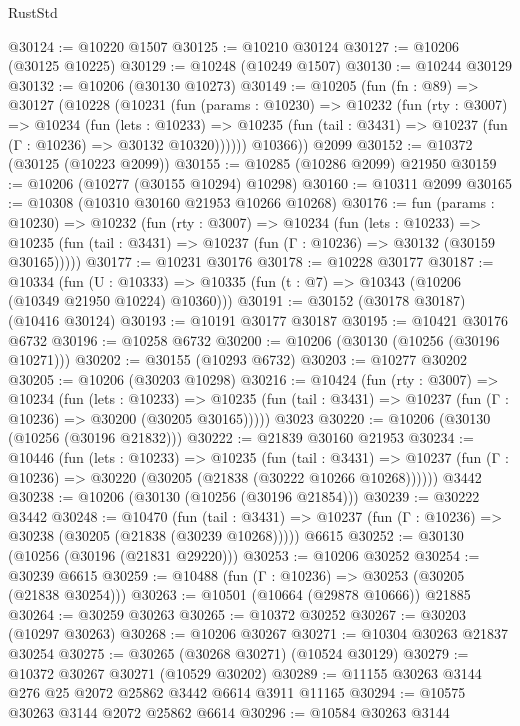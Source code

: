 \begin{lexlean}{RustStd}
\begin{coremodule}
@30124 := @10220 @1507
@30125 := @10210 @30124
@30127 := @10206 (@30125 @10225)
@30129 := @10248 (@10249 @1507)
@30130 := @10244 @30129
@30132 := @10206 (@30130 @10273)
@30149 := @10205
    (fun (fn : @89) =>
    @30127
      (@10228
        (@10231
          (fun (params : @10230) =>
          @10232
            (fun (rty : @3007) =>
            @10234
              (fun (lets : @10233) =>
              @10235 (fun (tail : @3431) => @10237 (fun (Γ : @10236) => @30132 @10320))))))
        @10366))
    @2099
@30152 := @10372 (@30125 (@10223 @2099))
@30155 := @10285 (@10286 @2099) @21950
@30159 := @10206 (@10277 (@30155 @10294) @10298)
@30160 := @10311 @2099
@30165 := @10308 (@10310 @30160 @21953 @10266 @10268)
@30176 := fun (params : @10230) =>
  @10232
    (fun (rty : @3007) =>
    @10234
      (fun (lets : @10233) =>
      @10235 (fun (tail : @3431) => @10237 (fun (Γ : @10236) => @30132 (@30159 @30165)))))
@30177 := @10231 @30176
@30178 := @10228 @30177
@30187 := @10334
    (fun (U : @10333) => @10335 (fun (t : @7) => @10343 (@10206 (@10349 @21950 @10224) @10360)))
@30191 := @30152 (@30178 @30187) (@10416 @30124)
@30193 := @10191 @30177 @30187
@30195 := @10421 @30176 @6732
@30196 := @10258 @6732
@30200 := @10206 (@30130 (@10256 (@30196 @10271)))
@30202 := @30155 (@10293 @6732)
@30203 := @10277 @30202
@30205 := @10206 (@30203 @10298)
@30216 := @10424
    (fun (rty : @3007) =>
    @10234
      (fun (lets : @10233) =>
      @10235 (fun (tail : @3431) => @10237 (fun (Γ : @10236) => @30200 (@30205 @30165)))))
    @3023
@30220 := @10206 (@30130 (@10256 (@30196 @21832)))
@30222 := @21839 @30160 @21953
@30234 := @10446
    (fun (lets : @10233) =>
    @10235
      (fun (tail : @3431) =>
      @10237 (fun (Γ : @10236) => @30220 (@30205 (@21838 (@30222 @10266 @10268))))))
    @3442
@30238 := @10206 (@30130 (@10256 (@30196 @21854)))
@30239 := @30222 @3442
@30248 := @10470
    (fun (tail : @3431) => @10237 (fun (Γ : @10236) => @30238 (@30205 (@21838 (@30239 @10268)))))
    @6615
@30252 := @30130 (@10256 (@30196 (@21831 @29220)))
@30253 := @10206 @30252
@30254 := @30239 @6615
@30259 := @10488 (fun (Γ : @10236) => @30253 (@30205 (@21838 @30254)))
@30263 := @10501 (@10664 (@29878 @10666)) @21885
@30264 := @30259 @30263
@30265 := @10372 @30252
@30267 := @30203 (@10297 @30263)
@30268 := @10206 @30267
@30271 := @10304 @30263 @21837 @30254
@30275 := @30265 (@30268 @30271) (@10524 @30129)
@30279 := @10372 @30267 @30271 (@10529 @30202)
@30289 := @11155 @30263 @3144 @276 @25 @2072 @25862 @3442 @6614 @3911 @11165
@30294 := @10575 @30263 @3144 @2072 @25862 @6614
@30296 := @10584 @30263 @3144

\end{coremodule}
\end{lexlean}
